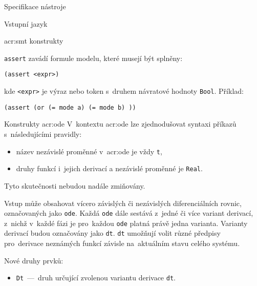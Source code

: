 \documentclass[thesis=M,czech]{FITthesis}[2012/06/26]
\newcommand{\acrlabel}[1]{acr:#1}
\newcommand{\acr}[1]{\acrshort{\acrlabel{#1}}}
\newcommand{\id}[1]{\texttt{#1}}
\begin{document}
\begin{section}{Specifikace nástroje}
\begin{subsection}{Vstupní jazyk}
\begin{subsubsection}{\acr{smt} konstrukty}

\begin{paragraph}{\id{assert}}\label{p:design:spec:ilang:smt:assert}
zavádí formule modelu, které musejí být splněny:
\begin{center}
\id{(assert <expr>)}
\end{center}
kde \id{<expr>} je výraz nebo token s~druhem návratové hodnoty \id{Bool}.
Příklad:
\begin{center}
\id{(assert (or (= mode a) (= mode b) ))}
\end{center}
\end{paragraph} %


\end{subsubsection} %


\begin{subsubsection}{Konstrukty \acr{ode}}
\label{sss:design:spec:ilang:ode}
V~kontextu \acr{ode} lze zjednodušovat
syntaxi příkazů s~následujícími pravidly:
\begin{itemize}
\item název nezávislé proměnné v~\acr{ode} je vždy \id{t},
\item druhy funkcí i~jejich derivací a nezávislé proměnné je \id{Real}.
\end{itemize}
Tyto skutečnosti nebudou nadále zmiňovány.

Vstup může obsahovat vícero závislých či nezávislých
diferenciálních rovnic, označovaných jako \id{ode}.
Každá \id{ode} dále sestává z~jedné či více variant derivací,
z~nichž v~každé fázi je pro~každou \id{ode} platná právě jedna varianta.
Varianty derivací budou označovány jako \id{dt}.
\id{dt} umožňují volit různé předpisy pro~derivace neznámých funkcí
závisle na~aktuálním stavu celého systému.


\begin{paragraph}{Nové druhy prvků:}\label{p:design:spec:ilang:ode:sorts}
\begin{itemize}
\item \id{Dt}~---~druh určující zvolenou variantu derivace \id{dt}.
\end{itemize}
\end{paragraph} %



\end{subsubsection}
\end{subsection}
\end{section}
\end{document}

